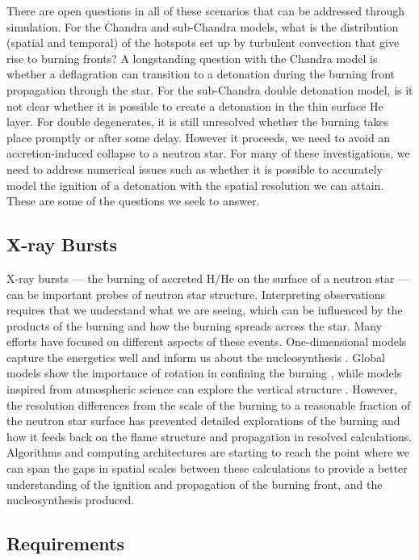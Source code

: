 \documentclass[a4paper]{jpconf}
\begin{document}
There are open questions in all of these scenarios that can be
addressed through simulation.  For the Chandra and sub-Chandra models,
what is the distribution (spatial and temporal) of the hotspots set up
by turbulent convection that give rise to burning fronts?  A
longstanding question with the Chandra model is whether a deflagration
can transition to a detonation during the burning front propagation
through the star.  For the sub-Chandra double detonation model, is it
not clear whether it is possible to create a detonation in the thin
surface He layer.  For double degenerates, it is still unresolved
whether the burning takes place promptly or after some delay.  However
it proceeds, we need to avoid an accretion-induced collapse to a
neutron star.  For many of these investigations, we need to address
numerical issues such as whether it is possible to accurately model
the ignition of a detonation with the spatial resolution we can
attain.  These are some of the questions we seek to answer.

\subsection{X-ray Bursts}

X-ray bursts --- the burning of accreted H/He on the surface of a
neutron star --- can be important probes of neutron star structure.
Interpreting observations requires that we understand what we are
seeing, which can be influenced by the products of the burning and how
the burning spreads across the star.  Many efforts have focused on
different aspects of these events.  One-dimensional models capture the
energetics well and inform us about the nucleosynthesis
\cite{woosley-xrb}.  Global models show the importance of rotation in
confining the burning \cite{SPIT_ETAL02}, while models inspired from
atmospheric science can explore the vertical structure
\cite{cavecchi:2012}.  However, the resolution differences from the
scale of the burning to a reasonable fraction of the neutron star
surface has prevented detailed explorations of the burning and how it
feeds back on the flame structure and propagation in resolved
calculations.  Algorithms and computing architectures are starting to
reach the point where we can span the gaps in spatial scales between
these calculations to provide a better understanding of the ignition
and propagation of the burning front, and the nucleosynthesis
produced.


\subsection{Requirements}
\end{document}
